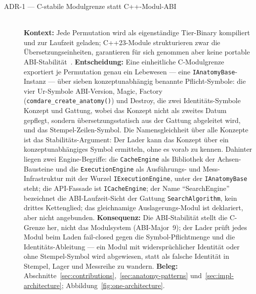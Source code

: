 \begin{description}

  \item[ADR-1 --- C-stabile Modulgrenze statt C++-Modul-ABI]\hfill\\
  \textbf{Kontext:} Jede Permutation wird als eigenständige Tier-Binary kompiliert und zur Laufzeit
  geladen; C++23-Module strukturieren zwar die Übersetzungseinheiten, garantieren für sich genommen
  aber keine portable ABI-Stabilität~\cite{wg21_modules_abi}.
  \textbf{Entscheidung:} Eine einheitliche C-Modulgrenze exportiert je Permutation genau ein Lebewesen
  --- eine \texttt{IAnatomyBase}-Instanz --- über sieben konzeptunabhängig benannte Pflicht-Symbole:
  die vier Ur-Symbole ABI-Version, Magic, Factory (\texttt{comdare\_create\_anatomy()}) und Destroy,
  die zwei Identitäts-Symbole Konzept und Gattung, wobei das Konzept nicht als zweites Datum gepflegt,
  sondern übersetzungsstatisch aus der Gattung abgeleitet wird, und das Stempel-Zeilen-Symbol. Die
  Namensgleichheit über alle Konzepte ist das Stabilitäts-Argument: Der Lader kann das Konzept
  über ein konzeptunabhängiges Symbol ermitteln, ohne es vorab zu kennen. Dahinter liegen zwei Engine-Begriffe: die \texttt{CacheEngine} als
  Bibliothek der Achsen-Bausteine und die \texttt{ExecutionEngine} als Ausführungs- und
  Mess-Infrastruktur mit der Wurzel \texttt{IExecutionEngine}, unter der \texttt{IAnatomyBase} steht;
  die API-Fassade ist \texttt{ICacheEngine}; der Name \enquote{SearchEngine} bezeichnet die ABI-Laufzeit-Sicht
  der Gattung \texttt{SearchAlgorithm}, kein drittes Kettenglied; das gleichnamige Auslagerungs-Modul ist
  deklariert, aber nicht angebunden.
  \textbf{Konsequenz:} Die ABI-Stabilität stellt die C-Grenze her, nicht das Modulsystem (ABI-Major~9);
  der Lader prüft jedes Modul beim Laden fail-closed gegen die Symbol-Pflichtmenge und die
  Identitäts-Ableitung --- ein Modul mit widersprüchlicher Identität oder ohne Stempel-Symbol wird
  abgewiesen, statt als falsche Identität in Stempel, Lager und Messreihe zu wandern.
  \textbf{Beleg:} Abschnitte~\ref{sec:contributions},~\ref{sec:anatomy-patterns}
  und~\ref{sec:impl-architecture}; Abbildung~\ref{fig:one-architecture}.


\end{description}
